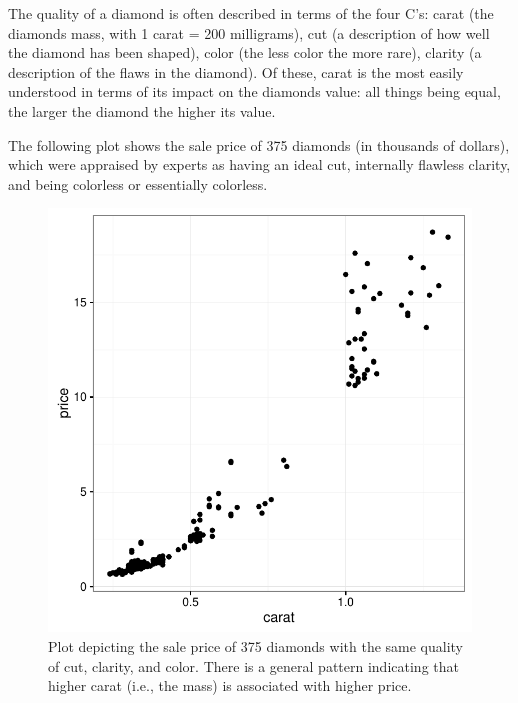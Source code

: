\documentclass[addpoints]{examsetup}\usepackage[]{graphicx}\usepackage[]{color}
\newenvironment{knitrout}{}{} %
\begin{document}
\begin{questions}
\begin{knitrout}
\end{knitrout}
\pagebreak

\question



The quality of a diamond is often described in terms of the four C's:
carat (the diamonds mass, with 1 carat = 200 milligrams), 
cut (a description of how well the diamond has been shaped),
color (the less color the more rare),
clarity (a description of the flaws in the diamond).
Of these, carat is the most easily understood in terms of its impact on the diamonds value: 
all things being equal, the larger the diamond the higher its value.

The following plot shows the sale price of 375 diamonds (in thousands of dollars), which were appraised by experts as having an ideal cut, internally flawless clarity, and being colorless or essentially colorless.


\begin{knitrout}
\color{fgcolor}\begin{figure}[h]

{\centering \includegraphics[width=.5\linewidth]{figure/unnamed-chunk-4-1} 

}

\caption[Plot depicting the sale price of 375 diamonds with the same quality of cut, clarity, and color]{Plot depicting the sale price of 375 diamonds with the same quality of cut, clarity, and color. There is a general pattern indicating that higher carat (i.e., the mass) is associated with higher price.}\label{fig:unnamed-chunk-4}
\end{figure}


\end{knitrout}


\end{questions}
\end{document}
